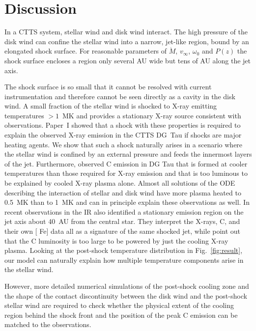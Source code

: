 \section{Discussion}
\label{sect:discussion}
In a CTTS system, stellar wind and disk wind interact. The high pressure of the disk wind can confine the stellar wind into a narrow, jet-like region, bound by an elongated shock surface. For reasonable parameters of $\dot M$, $v_\infty$, $\omega_0$ and $P(z)$ the shock surface encloses a region only several AU wide but tens of AU along the jet axis. 
 
The shock surface is so small that it cannot be resolved with current instrumentation and therefore cannot be seen directly as a cavity in the disk wind. A small fraction of the stellar wind is shocked to X-ray emitting temperatures $>1$~MK and provides a stationary X-ray source consistent with observations. 
Paper~I showed that a shock with these properties is required to explain the observed X-ray emission in the CTTS DG~Tau if shocks are major heating agents. We show that such a shock naturally arises in a scenario where the stellar wind is confined by an external pressure and feeds the innermost layers of the jet.
Furthermore, \citet{2013A&A...550L...1S} observed C emission in DG Tau that is formed at cooler temperatures than those required for X-ray emission and that is too luminous to be explained by cooled X-ray plasma alone. Almost all solutions of the ODE describing the interaction of stellar and disk wind have more plasma heated to 0.5~MK than to 1~MK and can in principle explain these observations as well. In recent observations in the IR \citet{2014arXiv1404.0728W} also identified a stationary emission region on the jet axis about 40~AU from the central star. They interpret the X-rays,  C, and their own [ Fe] data all as a signature of the same shocked jet, while \citet{2013A&A...550L...1S} point out that the C luminosity is too large to be powered by just the cooling X-ray plasma. Looking at the post-shock temperature distribution in Fig.~\ref{fig:result}, our model can naturally explain how multiple temperature components arise in the stellar wind.

However, more detailed numerical simulations of the post-shock cooling zone and the shape of the contact discontinuity between the disk wind and the post-shock stellar wind are required to check whether the physical extent of the cooling region behind the shock front and the position of the peak  C emission can be matched to the observations.

